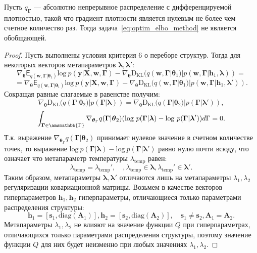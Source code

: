 \begin{theorem}
Пусть $q_{\boldsymbol{\Gamma}}$ --- абсолютно непрерывное распределение с дифференцируемой плотностью, такой что градиент плотности  является нулевым не более чем счетное количество раз. Тогда задача~\eqref{eq:optim_elbo_method} не является обобщающей.
\end{theorem}
\begin{proof}
Пусть выполнены условия критерия 6 о переборе структур. 
Тогда для некоторых векторов метапараметров $\boldsymbol{\lambda},\boldsymbol{\lambda}'$:
\[
    \nabla_{\boldsymbol{\theta}} \mathsf{E}_{q(\mathbf{w}, \boldsymbol{\Gamma}|\boldsymbol{\theta}_1)} \text{log}~p(\mathbf{y}|\mathbf{X}, \mathbf{w}, \boldsymbol{\Gamma}) -\nabla_{\boldsymbol{\theta}}  \text{D}_{\text{KL}}(q(\mathbf{w}, \boldsymbol{\Gamma}|\boldsymbol{\theta}_1) | p(\mathbf{w}, \boldsymbol{\Gamma}|\mathbf{h}_1, \boldsymbol{\lambda})) = 
\]
\[
= \nabla_{\boldsymbol{\theta}} \mathsf{E}_{q(\mathbf{w}, \boldsymbol{\Gamma}|\boldsymbol{\theta}_1)} \text{log}~p(\mathbf{y}|\mathbf{X}, \mathbf{w}, \boldsymbol{\Gamma}) - \nabla_{\boldsymbol{\theta}}  \text{D}_{\text{KL}}(q(\mathbf{w}, \boldsymbol{\Gamma}|\boldsymbol{\theta}_1) | p(\mathbf{w}, \boldsymbol{\Gamma}|\mathbf{h}_1, \boldsymbol{\lambda}')).
\]
Сокращая равные слагаемые в равенстве получим:
\[
\nabla_{\boldsymbol{\theta}}  \text{D}_{\text{KL}}(q(\boldsymbol{\Gamma}|\boldsymbol{\theta}_2) | p(\boldsymbol{\Gamma}| \boldsymbol{\lambda})) = \nabla_{\boldsymbol{\theta}} \text{D}_{\text{KL}}(q(\boldsymbol{\Gamma}|\boldsymbol{\theta}_2) | p(\boldsymbol{\Gamma}| \boldsymbol{\lambda}')),
\] 
\[
\int_{\boldsymbol{\Gamma} \in \amsmathbb{\Gamma}} \nabla_{\boldsymbol{\theta}_\Gamma} q(\boldsymbol{\Gamma}|\boldsymbol{\theta}_2) (\text{log}~p(\boldsymbol{\Gamma}| \boldsymbol{\lambda}) - \text{log}~p(\boldsymbol{\Gamma}| \boldsymbol{\lambda}')) d\Gamma = 0.
\]
Т.к. выражение $ \nabla_{\boldsymbol{\theta}_\Gamma} q(\boldsymbol{\Gamma}|\boldsymbol{\theta}_2)$ принимает нулевое значение в счетном количестве точек, то выражение $\text{log}~p(\boldsymbol{\Gamma}| \boldsymbol{\lambda}) - \text{log}~p(\boldsymbol{\Gamma}| \boldsymbol{\lambda}')$ равно нулю почти всюду, что означает что метапараметр температуры $\lambda_\text{temp}$  равен:
\[
\lambda_\text{temp} = \lambda_\text{temp}',\quad, \lambda_\text{temp} \in \boldsymbol{\lambda}, \lambda_\text{temp}' \in \boldsymbol{\lambda}'.
\]
Таким образом, метапараметры $\boldsymbol{\lambda},\boldsymbol{\lambda}'$ отличаются лишь на метапараметры  $\lambda_1, \lambda_2$ регуляризации ковариационной матрицы. 
Возьмем в качестве векторов гиперпараметров $\mathbf{h}_1,\mathbf{h}_2$ гиперпараметры, отличающиеся только параметрами распределения структуры:
\[
    \mathbf{h}_1 = [\mathbf{s}_1, \text{diag}(\mathbf{A}_1)], \mathbf{h}_2 = [\mathbf{s}_2, \text{diag}(\mathbf{A}_2)],\quad \mathbf{s}_1 \neq \mathbf{s}_2, \mathbf{A}_1 = \mathbf{A}_2.
\]
Метапараметры $\lambda_1, \lambda_2$ не влияют на значение функции $Q$ при гиперпараметрах, отличающихся только параметрами распределения структуры, поэтому значение функции $Q$ для них будет неизменно при любых значениях $\lambda_1, \lambda_2$.

\end{proof}


